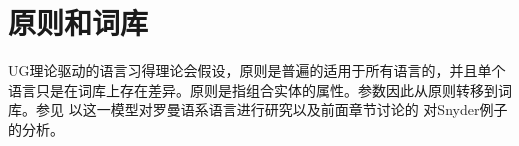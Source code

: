 
\section{原则和词库}

UG理论驱动的语言习得理论会假设，原则是普遍的适用于所有语言的，并且单个语言只是在词库上存在差异。原则是指组合实体的属性。参数因此从原则转移到词库\citep[]{Chomsky99a}。参见 \citet{MR2010a}以这一模型对罗曼语系语言进行研究以及前面章节讨论的 \citet[]{SonS2008a}对Snyder例子的分析。

